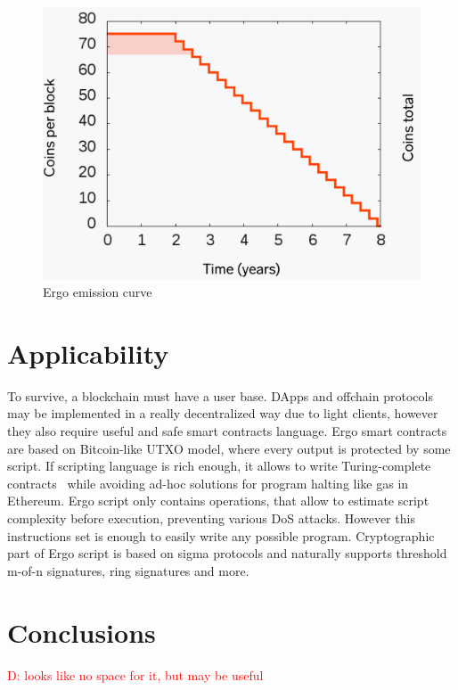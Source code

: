\documentclass[]{article}
\newcommand{\dnote}[1]{\textcolor{red}{D: {#1}}}
\begin{document}
    \begin{figure}[h]
        \centering
        \includegraphics[width=\textwidth]{emission.png}
        \caption{Ergo emission curve
        \label{fig:emission} }
    \end{figure}


    \section{Applicability}

    To survive, a blockchain must have a user base.
    DApps and offchain protocols may be implemented in a really decentralized way due to light clients,
    however they also require useful and safe smart contracts language.
    Ergo smart contracts are based on Bitcoin-like UTXO model, where every output is protected by some script.
    If scripting language is rich enough, it allows to write Turing-complete contracts~\cite{chepurnoy2018self}
    while avoiding ad-hoc solutions for program halting like gas in Ethereum.
    Ergo script only contains operations, that allow to estimate script complexity before execution,
    preventing various DoS attacks.
    However this instructions set is enough to easily write any possible program.
    Cryptographic part of Ergo script is based on sigma protocols and naturally supports
    threshold m-of-n signatures, ring signatures and more.


    \section{Conclusions}

    \dnote{looks like no space for it, but may be useful}


    
\end{document}
